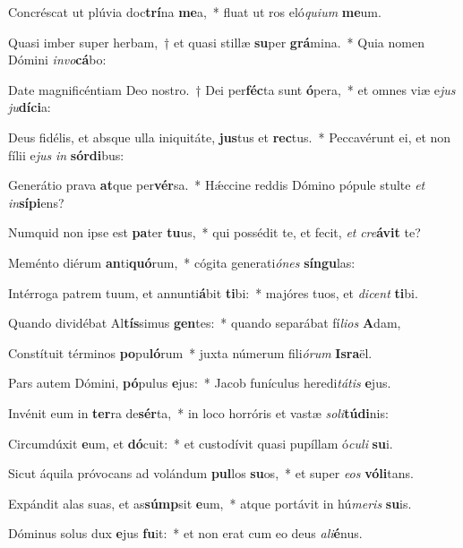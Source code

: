 \item Concréscat ut plúvia doc\textbf{trí}na \textbf{me}a,~* fluat ut ros eló\textit{qui}\textit{um} \textbf{me}um.
\item Quasi imber super herbam,~† et quasi stillæ \textbf{su}per \textbf{grá}mina.~* Quia nomen Dómini \textit{in}\textit{vo}\textbf{cá}bo:
\item Date magnificéntiam Deo nostro.~† Dei per\textbf{féc}ta sunt \textbf{ó}pera,~* et omnes viæ e\textit{jus} \textit{ju}\textbf{dí}\textbf{ci}a:
\item Deus fidélis, et absque ulla iniquitáte, \textbf{jus}tus et \textbf{rec}tus.~* Peccavérunt ei, et non fílii e\textit{jus} \textit{in} \textbf{sór}\textbf{di}bus:
\item Generátio prava \textbf{at}que per\textbf{vér}sa.~* Hǽccine reddis Dómino pópule stulte \textit{et} \textit{in}\textbf{sí}\textbf{pi}ens?
\item Numquid non ipse est \textbf{pa}ter \textbf{tu}us,~* qui possédit te, et fecit, \textit{et} \textit{cre}\textbf{á}\textbf{vit} te?
\item Meménto diérum \textbf{an}ti\textbf{quó}rum,~* cógita generati\textit{ó}\textit{nes} \textbf{sín}\textbf{gu}las:
\item Intérroga patrem tuum, et annunti\textbf{á}bit \textbf{ti}bi:~* majóres tuos, et \textit{di}\textit{cent} \textbf{ti}bi.
\item Quando dividébat Al\textbf{tís}simus \textbf{gen}tes:~* quando separábat fí\textit{li}\textit{os} \textbf{A}dam,
\item Constítuit términos \textbf{po}pu\textbf{ló}rum~* juxta númerum fili\textit{ó}\textit{rum} \textbf{Is}\textbf{ra}ël.
\item Pars autem Dómini, \textbf{pó}pulus \textbf{e}jus:~* Jacob funículus heredi\textit{tá}\textit{tis} \textbf{e}jus.
\item Invénit eum in \textbf{ter}ra de\textbf{sér}ta,~* in loco horróris et vastæ \textit{so}\textit{li}\textbf{tú}\textbf{di}nis:
\item Circumdúxit \textbf{e}um, et \textbf{dó}cuit:~* et custodívit quasi pupíllam ó\textit{cu}\textit{li} \textbf{su}i.
\item Sicut áquila próvocans ad volándum \textbf{pul}los \textbf{su}os,~* et super \textit{e}\textit{os} \textbf{vó}\textbf{li}tans.
\item Expándit alas suas, et as\textbf{súmp}sit \textbf{e}um,~* atque portávit in hú\textit{me}\textit{ris} \textbf{su}is.
\item Dóminus solus dux \textbf{e}jus \textbf{fu}it:~* et non erat cum eo deus \textit{a}\textit{li}\textbf{é}nus.
